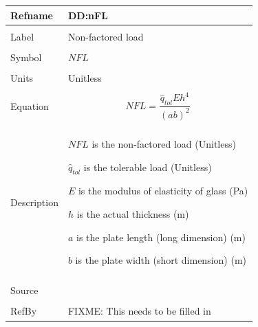 \documentclass[12pt]{article}
\begin{document}
\noindent \begin{minipage}{\textwidth}
\begin{tabular}{p{} p{}}
\toprule \textbf{Refname} & \textbf{DD:nFL}
\label{DD:nFL}
\\ \midrule \\
Label & Non-factored load
\\ \midrule \\
Symbol & $NFL$
\\ \midrule \\
Units & Unitless
\\ \midrule \\
Equation & \begin{dmath}
           NFL=\frac{{\hat{q}_{tol}} E h^{4}}{\left(a b\right)^{2}}
           \end{dmath}
\\ \midrule \\
Description & \begin{description}
              \item{$NFL$ is the non-factored load (Unitless)}
              \item{${\hat{q}_{tol}}$ is the tolerable load (Unitless)}
              \item{$E$ is the modulus of elasticity of glass (Pa)}
              \item{$h$ is the actual thickness (m)}
              \item{$a$ is the plate length (long dimension) (m)}
              \item{$b$ is the plate width (short dimension) (m)}
              \end{description}
\\ \midrule \\
Source & 
\\ \midrule \\
RefBy & FIXME: This needs to be filled in
\\ \bottomrule \end{tabular}
\end{minipage}\\
~\newline
\end{document}

